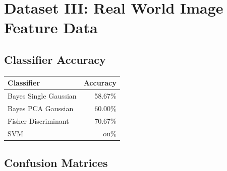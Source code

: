 \documentclass[a4paper]{article}
\begin{document}
\section{Dataset III: Real World Image Feature Data}

\subsection{Classifier Accuracy}

\begin{tabular}{ | l | r | }
\hline
\textbf{Classifier} & \textbf{Accuracy} \\
\hline
Bayes Single Gaussian  &   58.67\% \\
\hline
Bayes PCA Gaussian  &   60.00\% \\
\hline
Fisher Discriminant  &   70.67\% \\
\hline
SVM          &   ou\% \\
\hline
\end{tabular}


\subsection{Confusion Matrices}
\end{document}
